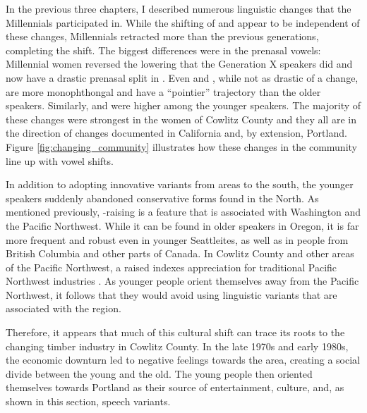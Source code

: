 
In the previous three chapters, I described numerous linguistic changes that the Millennials participated in. While the shifting of \bat and \bet appear to be independent of these changes, Millennials retracted \bit more than the previous generations, completing the shift. The biggest differences were in the prenasal vowels: Millennial women reversed the \ban lowering that the Generation X speakers did and now have a drastic prenasal split in \trap. Even \ben and \bin, while not as drastic of a change, are more monophthongal and have a ``pointier'' trajectory than the older speakers. Similarly, \bang and \bing were higher among the younger speakers. The majority of these changes were strongest in the women of Cowlitz County and they all are in the direction of changes documented in California and, by extension, Portland. Figure \ref{fig:changing_community} illustrates how these changes in the community line up with vowel shifts.

In addition to adopting innovative variants from areas to the south, the younger speakers suddenly abandoned conservative forms found in the North. As mentioned previously, \bag-raising is a feature that is associated with Washington and the Pacific Northwest. While it can be found in older speakers in Oregon, it is far more frequent and robust even in younger Seattleites, as well as in people from British Columbia and other parts of Canada. In Cowlitz County and other areas of the Pacific Northwest, a raised \bag indexes appreciation for traditional Pacific Northwest industries \citep{swan_2018_CWSL, stanley_2018_pwpl}. As younger people orient themselves away from the Pacific Northwest, it follows that they would avoid using linguistic variants that are associated with the region.

Therefore, it appears that much of this cultural shift can trace its roots to the changing timber industry in Cowlitz County. In the late 1970s and early 1980s, the economic downturn led to negative feelings towards the area, creating a social divide between the young and the old. The young people then oriented themselves towards Portland as their source of entertainment, culture, and, as shown in this section, speech variants.





